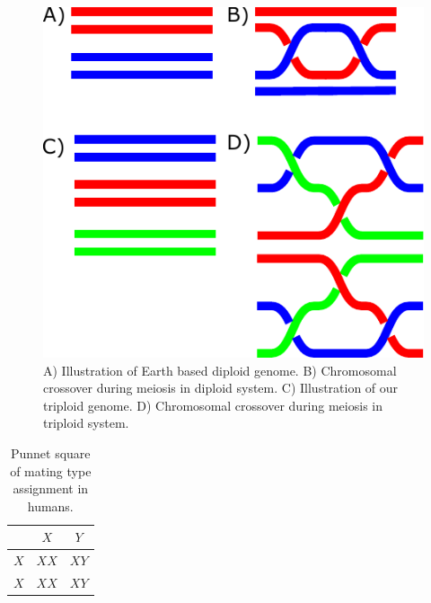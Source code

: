 \documentclass{report}
\begin{document}
\begin{figure}
\centering
\includegraphics[width=0.4\columnwidth]{AshleyFig/cross_3.pdf}
\caption{A) Illustration of Earth based diploid genome. B) Chromosomal crossover during meiosis in diploid system. C) Illustration of our triploid genome. D) Chromosomal crossover during meiosis in triploid system.}
\label{fig:cross3}
\end{figure}


\begin{table}
\centering
\begin{tabular}{ |c| c c| } 
\hline
& $X$ & $Y$ \\
\hline
$X$ & $XX$ & $XY$ \\ 
$X$ & $XX$ & $XY$ \\ 
 \hline
 \end{tabular}
\caption{Punnet square of mating type assignment in humans.} 
\label{tab:punnet_human}
\end{table}
\end{document}
